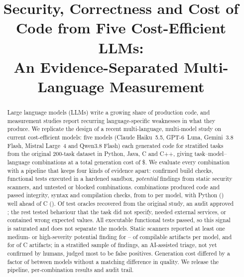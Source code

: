 \documentclass[conference]{IEEEtran}
\begin{document}
\title{Security, Correctness and Cost of Code from Five Cost-Efficient LLMs:\\
An Evidence-Separated Multi-Language Measurement}

\author{
}

\maketitle

\begin{abstract}
Large language models (LLMs) write a growing share of production code, and
measurement studies report recurring language-specific weaknesses in what they
produce. We replicate the design of a recent multi-language, multi-model study
on current cost-efficient models: five models (Claude Haiku~5.5, GPT-6~Luna,
Gemini~3.8 Flash, Mistral Large~4 and Qwen3.8 Flash) each generated code for
\nTasks{} stratified tasks from the original 200-task dataset in Python, Java,
C and C++, giving \nPlanned{} task--model--language combinations at a total
generation cost of \$\costTotal{}. We evaluate every combination with a
pipeline that keeps four kinds of evidence apart: confirmed build checks,
functional tests executed in a hardened sandbox, \emph{potential} findings from
static security scanners, and untested or blocked combinations. \nArtifacts{}
combinations produced code and \pGOnePass{} passed integrity, syntax and
compilation checks, from \gOneQwen{} to \gOneLuna{} per model, with Python
(\gOnePy{}) well ahead of C (\gOneC{}). Of \nOracleProposed{} test oracles
recovered from the original study, an audit approved \nOracleApproved{}; the
rest tested behaviour that the task did not specify, needed external services,
or contained wrong expected values. All \nFuncExecuted{} executable functional
tests passed, so this signal is saturated and does not separate the models. Static
scanners reported at least one medium- or high-severity potential finding for
\secMHGemini{}--\secMHLuna{} of compilable artifacts per model, and for
\secMHC{} of C artifacts; in a stratified sample of \nTriage{} findings, an
AI-assisted triage, not yet confirmed by humans, judged most to be false
positives. Generation cost differed by a factor of \costRatioMistralLuna{}
between models without a matching difference in quality. We release the
pipeline, per-combination results and audit trail.
\end{abstract}
\end{document}
